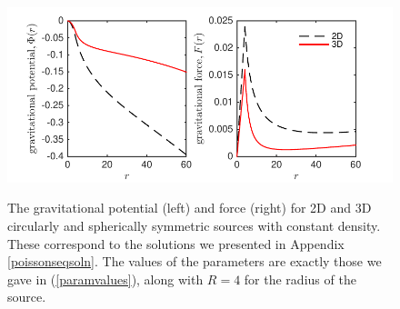 \documentclass[a4paper, 12pt]{article}
\numberwithin{equation}{section}
\begin{document}
\begin{figure}[!t]
      \begin{center}
{\includegraphics[scale=1,angle=0]{images/rhoin_12_comps}}
      \end{center}
\caption{ The gravitational potential (left) and force (right) for 2D and 3D circularly and spherically symmetric sources with constant density. These correspond to the solutions we presented in Appendix \ref{poissonseqsoln}. The values of the parameters are exactly those we gave in (\ref{paramvalues}), along with $R=4$ for the radius of the source. }\label{fig:poisson_soln}
\end{figure}


\footnotesize{

}
\end{document}
